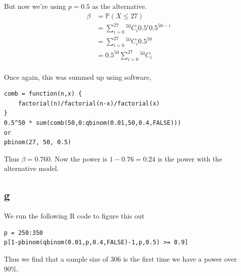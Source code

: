 \documentclass{article}
\newcommand{\prob}{\mathbb{P}}
\begin{document}
But now we're using $p=0.5$ as the alternative.
\begin{align*}
    \beta &= \prob(X \leq 27) \\
    &= \sum_{i=0}^{27} {}^{50}C_i 0.5^i 0.5^{50-i} \\
    &= \sum_{i=0}^{27} {}^{50}C_i 0.5^{50} \\
    &= 0.5^{50} \sum_{i=0}^{27} {}^{50}C_i \\
\end{align*}

Once again, this was summed up using software,
\begin{verbatim}
comb = function(n,x) {
    factorial(n)/factorial(n-x)/factorial(x)
}
0.5^50 * sum(comb(50,0:qbinom(0.01,50,0.4,FALSE)))
or
pbinom(27, 50, 0.5)
\end{verbatim}

Thus $\beta = 0.760$. Now the power is $1-0.76=0.24$ 
is the power with the alternative model.

\subsection{g}
We run the following R code to figure this out
\begin{verbatim}
p = 250:350
p[1-pbinom(qbinom(0.01,p,0.4,FALSE)-1,p,0.5) >= 0.9]
\end{verbatim}

Thus we find that a sample size of 306 is the first time we have a power over
90\%.
\end{document}
